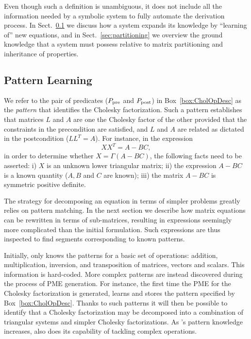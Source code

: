 \documentclass{llncs}
\newcommand{\click}{{\sc{Cl\makebox[.58\width][c]{1}ck}}}
\begin{document}
Even though such a definition is unambiguous, it does not include all the
information needed by a symbolic system to fully automate the derivation
process. In Sect.~\ref{subsec:pattLearn} we discuss how a system 
expands its knowledge by ``learning of'' new equations, and in
Sect.~\ref{sec:partitioning} we overview the ground knowledge that a system must
possess relative to matrix partitioning and inheritance of properties.


\subsection{Pattern Learning}\label{subsec:pattLearn}

We refer to the pair of predicates ($P_{\rm pre}$ and $P_{\rm post}$)
in Box~\ref{box:CholOpDesc} as the {\em pattern} that identifies the
Cholesky factorization.  Such a pattern establishes that matrices $L$
and $A$ are one the Cholesky factor of the other provided that the
constraints in the precondition are satisfied, and $L$ and $A$ are
related as dictated in the postcondition ($L L^T = A$).  For instance,
in the expression
$$X X^T = A - B C,$$ 
in order to determine whether $X = \Gamma(A - B C)$, 
the following facts need to be asserted:
i) $X$ is an unknown lower triangular matrix; 
ii) the expression $A - B C$ is a known quantity ($A, B$ and $C$ are known); 
iii) the matrix $A - B C$ is symmetric positive definite.

The strategy for decomposing an equation in terms of simpler problems
greatly relies on pattern matching.  In the next section we describe
how matrix equations can be rewritten in terms of sub-matrices,
resulting in expressions seemingly more complicated than the initial
formulation. Such expressions are thus inspected to find segments 
corresponding to known patterns.

Initially, \click{} only knows the patterns for a basic set
of operations: addition, multiplication, inversion, and transposition
of matrices, vectors and scalars. This information is hard-coded.
More complex patterns are instead discovered during the process of PME
generation. For instance, the first time the PME for the Cholesky
factorization is generated, \click{} learns and stores the pattern
specified by Box~\ref{box:CholOpDesc}. Thanks to such patterns it will
then be possible to identify that a Cholesky factorization may be
decomposed into a combination of triangular systems and simpler
Cholesky factorizations. As \click{}'s pattern knowledge
increases, also does its capability of tackling complex operations.
\end{document}
